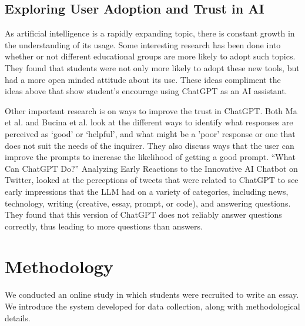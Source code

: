 \documentclass[manuscript,screen,acmsmall]{acmart}
\begin{document}
    


\subsection{Exploring User Adoption and Trust in AI}

    As artificial intelligence is a rapidly expanding topic, there is constant growth in the understanding of its usage. Some interesting research has been done into whether or not different educational groups are more likely to adopt such topics. They found that students were not only more likely to adopt these new tools, but had a more open minded attitude about its use. These ideas compliment the ideas above that show student's encourage using ChatGPT as an AI assistant. 

    Other important research is on ways to improve the trust in ChatGPT. Both Ma et al. and Bucina et al. look at the different ways to identify what responses are perceived as `good' or `helpful', and what might be a 'poor' response or one that does not suit the needs of the inquirer. They also discuss ways that the user can improve the prompts to increase the likelihood of getting a good prompt. “What Can ChatGPT Do?” Analyzing Early Reactions to the Innovative AI Chatbot on Twitter, looked at the perceptions of tweets that were related to ChatGPT to see early impressions that the LLM had on a variety of categories, including news, technology, writing (creative, essay, prompt, or code), and answering questions. They found that this version of ChatGPT does not reliably answer questions correctly, thus leading to more questions than answers.



\section{Methodology}
We conducted an online study in which students were recruited to write an essay. We introduce the system developed for data collection, along with methodological details.
\end{document}
